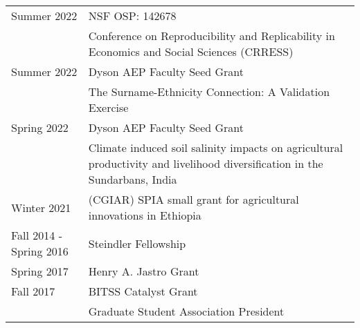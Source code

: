 \documentclass[
  11pt]{article}
\def\toprule{}
\def\bottomrule{}
\begin{document}
\begin{longtable}[]{@{}
  >{\raggedright\arraybackslash}p{}
  >{\raggedleft\arraybackslash}p{}@{}}
\toprule
\endhead
Summer 2022 & NSF OSP: 142678 \\
& Conference on Reproducibility and Replicability in Economics and
Social Sciences (CRRESS) \\
Summer 2022 & Dyson AEP Faculty Seed Grant \\
& The Surname-Ethnicity Connection: A Validation Exercise \\
Spring 2022 & Dyson AEP Faculty Seed Grant \\
& Climate induced soil salinity impacts on agricultural productivity and
livelihood diversification in the Sundarbans, India \\
Winter 2021 & (CGIAR) SPIA small grant for agricultural innovations in
Ethiopia \\
Fall 2014 - Spring 2016 & Steindler Fellowship \\
Spring 2017 & Henry A. Jastro Grant \\
Fall 2017 & BITSS Catalyst Grant \\
2017 & Graduate Student Association President \\
\bottomrule
\end{longtable}
\end{document}
